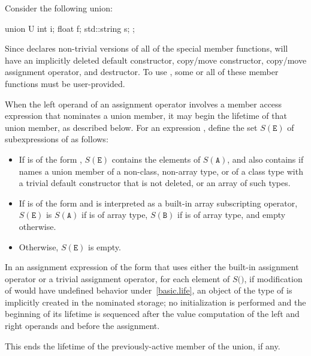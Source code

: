 \pnum
\begin{example}
Consider the following union:
\begin{codeblock}
union U {
  int i;
  float f;
  std::string s;
};
\end{codeblock}

Since  declares non-trivial versions of all of the special
member functions,  will have an implicitly deleted default constructor,
copy/move constructor,
copy/move assignment operator, and destructor.
To use , some or all of these member functions
must be user-provided.
\end{example}

\pnum
When the left operand of an assignment operator
involves a member access expression
that nominates a union member,
it may begin the lifetime of that union member,
as described below.
For an expression ,
define the set $S(\mathtt{E})$
of subexpressions of 
as follows:
\begin{itemize}
\item
If  is of the form ,
$S(\mathtt{E})$ contains the elements of $S(\mathtt{A})$,
and also contains 
if  names a union member of a non-class, non-array type,
or of a class type with a trivial default constructor that is not deleted,
or an array of such types.
\item
If  is of the form 
and is interpreted as a built-in array subscripting operator,
$S(\mathtt{E})$ is $S(\mathtt{A})$ if  is of array type,
$S(\mathtt{B})$ if  is of array type,
and empty otherwise.
\item
Otherwise, $S(\mathtt{E})$ is empty.
\end{itemize}
In an assignment expression of the form 
that uses either the built-in assignment operator
or a trivial assignment operator,
for each element  of $S($$)$,
if modification of  would have undefined behavior under~\ref{basic.life},
an object of the type of  is implicitly created
in the nominated storage;
no initialization is performed and
the beginning of its lifetime is sequenced after
the value computation of the left and right operands
and before the assignment.
\begin{note}
This ends the lifetime of the previously-active
member of the union, if any.
\end{note}
